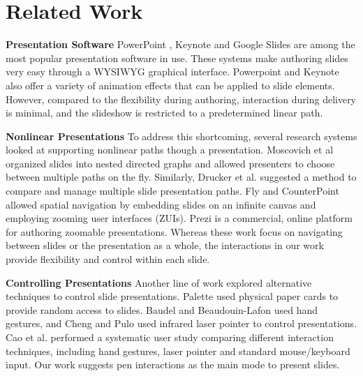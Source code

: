 \section{Related Work}

\textbf{Presentation Software} PowerPoint \cite{powerpoint2017}, Keynote \cite{keynote2017} and Google Slides \cite{googleslides2017} are among the most popular presentation software in use. These systems make authoring slides very easy through a WYSIWYG graphical interface. Powerpoint and Keynote also offer a variety of animation effects that can be applied to slide elements. However, compared to the flexibility during authoring, interaction during delivery is minimal, and the slideshow is restricted to a predetermined linear path. 

\textbf{Nonlinear Presentations} To address this shortcoming, several research systems looked at supporting nonlinear paths though a presentation. Moscovich et al \cite{moscovich2004customizable} organized slides into nested directed graphs and allowed presenters to choose between multiple paths on the fly. Similarly, Drucker et al. \cite{drucker2006comparing} suggested a method to compare and manage multiple slide presentation paths. Fly \cite{lichtschlag2009fly} and CounterPoint \cite{good2002zoomable} allowed spatial navigation by embedding slides on an infinite canvas and employing zooming user interfaces (ZUIs). Prezi \cite{prezi2017} is a commercial, online platform for authoring zoomable presentations. Whereas these work focus on navigating between slides or the presentation as a whole, the interactions in our work provide flexibility and control within each slide.

\textbf{Controlling Presentations} Another line of work explored alternative techniques to control slide presentations. Palette \cite{nelson1999palette} used physical paper cards to provide random access to slides.  Baudel and Beaudouin-Lafon \cite{baudel1993charade} used hand gestures, and Cheng and Pulo \cite{cheng2003direct} used infrared laser pointer to control presentations. Cao et al. \cite{cao2005evaluation} performed a systematic user study comparing different interaction techniques, including hand gestures, laser pointer and standard mouse/keyboard input. Our work suggests pen interactions  as the main mode to present slides.

